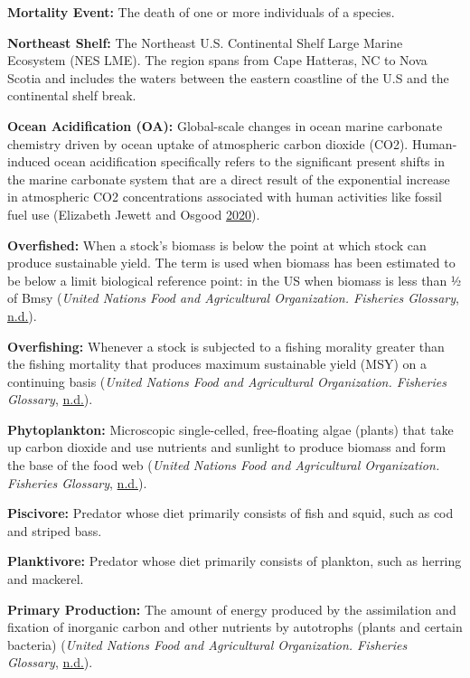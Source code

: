 \documentclass[
]{book}
\begin{document}
\textbf{Mortality Event: }
The death of one or more individuals of a species.

\textbf{Northeast Shelf:}
The Northeast U.S. Continental Shelf Large Marine Ecosystem (NES LME). The region spans from Cape Hatteras, NC to Nova Scotia and includes the waters between the eastern coastline of the U.S and the continental shelf break.

\textbf{Ocean Acidification (OA):}
Global-scale changes in ocean marine carbonate chemistry driven by ocean uptake of atmospheric carbon dioxide (CO2). Human-induced ocean acidification specifically refers to the significant present shifts in the marine carbonate system that are a direct result of the exponential increase in atmospheric CO2 concentrations associated with human activities like fossil fuel use (Elizabeth Jewett and Osgood \protect\hyperlink{ref-jewett2020}{2020}).

\textbf{Overfished:}
When a stock's biomass is below the point at which stock can produce sustainable yield. The term is used when biomass has been estimated to be below a limit biological reference point: in the US when biomass is less than ½ of Bmsy (\emph{United Nations Food and Agricultural Organization. Fisheries Glossary}, \protect\hyperlink{ref-unfao}{n.d.}).

\textbf{Overfishing:}
Whenever a stock is subjected to a fishing morality greater than the fishing mortality that produces maximum sustainable yield (MSY) on a continuing basis (\emph{United Nations Food and Agricultural Organization. Fisheries Glossary}, \protect\hyperlink{ref-unfao}{n.d.}).

\textbf{Phytoplankton:}
Microscopic single-celled, free-floating algae (plants) that take up carbon dioxide and use nutrients and sunlight to produce biomass and form the base of the food web (\emph{United Nations Food and Agricultural Organization. Fisheries Glossary}, \protect\hyperlink{ref-unfao}{n.d.}).

\textbf{Piscivore:}
Predator whose diet primarily consists of fish and squid, such as cod and striped bass.

\textbf{Planktivore:}
Predator whose diet primarily consists of plankton, such as herring and mackerel.

\textbf{Primary Production:}
The amount of energy produced by the assimilation and fixation of inorganic carbon and other nutrients by autotrophs (plants and certain bacteria) (\emph{United Nations Food and Agricultural Organization. Fisheries Glossary}, \protect\hyperlink{ref-unfao}{n.d.}).
\end{document}
